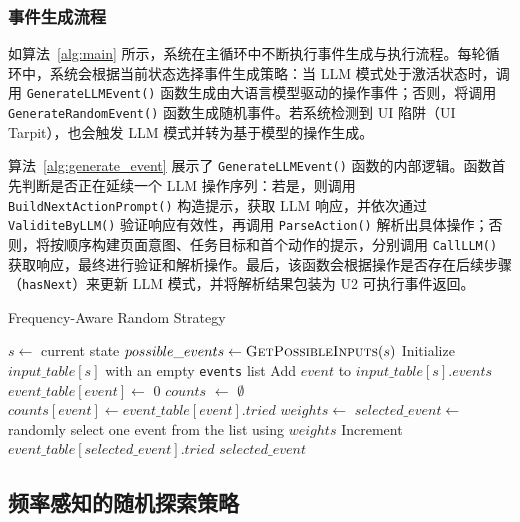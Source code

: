 \documentclass[twocolumn, 10pt]{article}
\begin{document}
\subsubsection{事件生成流程}
\label{sec:generate_event}

如算法~\ref{alg:main} 所示，系统在主循环中不断执行事件生成与执行流程。每轮循环中，系统会根据当前状态选择事件生成策略：当 LLM 模式处于激活状态时，调用 \texttt{GenerateLLMEvent()} 函数生成由大语言模型驱动的操作事件；否则，将调用 \texttt{GenerateRandomEvent()} 函数生成随机事件。若系统检测到 UI 陷阱（UI Tarpit），也会触发 LLM 模式并转为基于模型的操作生成。

算法~\ref{alg:generate_event} 展示了 \texttt{GenerateLLMEvent()} 函数的内部逻辑。函数首先判断是否正在延续一个 LLM 操作序列：若是，则调用 \texttt{BuildNextActionPrompt()} 构造提示，获取 LLM 响应，并依次通过 \texttt{ValiditeByLLM()} 验证响应有效性，再调用 \texttt{ParseAction()} 解析出具体操作；否则，将按顺序构建页面意图、任务目标和首个动作的提示，分别调用 \texttt{CallLLM()} 获取响应，最终进行验证和解析操作。最后，该函数会根据操作是否存在后续步骤（\texttt{hasNext}）来更新 LLM 模式，并将解析结果包装为 U2 可执行事件返回。

\begin{algorithm}[t]
\caption{Frequency-Aware Random Strategy}
\label{alg:random}
\begin{algorithmic}[1]
\State $s \gets$ current state
    \State $possible\_events \gets \Call{GetPossibleInputs}{s}$
    \State Initialize $input\_table[s]$ with an empty \texttt{events} list
        \State Add $event$ to $input\_table[s].events$
            \State $event\_table[event] \gets$ 0
        \EndIf
    \EndFor
\EndIf
    \State $counts$ $\gets$ $\emptyset$
        \State $counts[event] \gets event\_table[event].tried$
    \EndFor
    \State $weights \gets$ 
    \State $selected\_event \gets$ randomly select one event from the list using $weights$
    \State Increment $event\_table[selected\_event].tried$
    \State \Return $selected\_event$
\EndFunction
\end{algorithmic}
\end{algorithm}

\subsection{频率感知的随机探索策略}
\label{sec:frequency}
\end{document}
